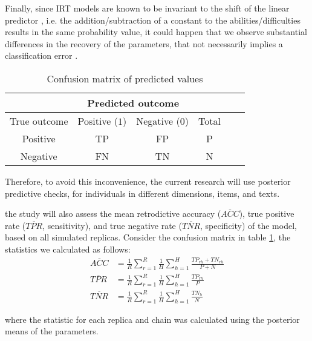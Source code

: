 Finally, since IRT models are known to be invariant to the shift of the linear predictor \cite{Baker_et_al_1992, Bock_1972}, i.e. the addition/subtraction of a constant to the abilities/difficulties results in the same probability value, it could happen that we observe substantial differences in the recovery of the parameters, that not necessarily implies a classification error  \cite{Wollack_2002}. 
%
\begin{table}[!h]
	\centering
	\begin{tabular}{ c|c|c|cc|c| } 
		& \multicolumn{2}{c}{Predicted outcome} \\
		\hline
		\hline
		True outcome 	& Positive ($1$) 	& Negative ($0$) 	& Total \\
		\hline
		\hline
		Positive 		& TP 				& FP 				& P \\ 
		Negative 		& FN 				& TN 				& N \\ 
	\end{tabular}
	\caption{Confusion matrix of predicted values}
	\label{tab:confusion_matrix}
\end{table}

Therefore, to avoid this inconvenience, the current research will use posterior predictive checks, for individuals in different dimensions, items, and texts.


the study will also assess the mean retrodictive accuracy ($\overline{ACC}$), true positive rate ($\overline{TPR}$, sensitivity), and true negative rate ($\overline{TNR}$, specificity) of the model, based on all simulated replicas. Consider the confusion matrix in table \ref{tab:confusion_matrix}, the statistics we calculated as follows:
%
\begin{align}
	\overline{ACC} &= \frac{1}{R} \sum_{r=1}^{R} \frac{1}{H} \sum_{h=1}^{H} \frac{TP_{rh} + TN_{rh}}{ P + N} \\
	\overline{TPR} &= \frac{1}{R} \sum_{r=1}^{R} \frac{1}{H} \sum_{h=1}^{H} \frac{TP_{rh}}{P} \\
	\overline{TNR} &= \frac{1}{R} \sum_{r=1}^{R} \frac{1}{H} \sum_{h=1}^{H} \frac{TN_{h}}{N}
\end{align}

\noindent where the statistic for each replica and chain was calculated using the posterior means of the parameters.



